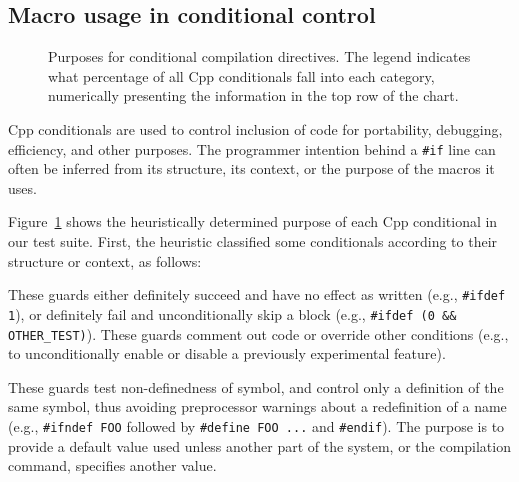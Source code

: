 \documentclass[10pt]{article}
\newcommand{\captionsmall}[1]{\caption[]{\small #1}}
\begin{document}


\subsection{Macro usage in conditional control}
\label{sec:ccd}

\begin{figure}
\centerline{}
\captionsmall{Purposes for conditional compilation directives.
  The legend indicates what percentage of all Cpp conditionals fall
  into each category, numerically presenting the information in the top row
  of the chart.}
\label{fig:ccd-categories}
\end{figure}

Cpp conditionals are used to control inclusion of code for portability,
debugging, efficiency, and other purposes.  The programmer intention behind
a {\tt \#if} line can often be inferred from its structure, its context, or
the purpose of the macros it uses.


Figure~\ref{fig:ccd-categories} shows the heuristically determined purpose
of each Cpp conditional in our test suite.  First, the heuristic classified
some conditionals according to their structure or context, as follows:
\begin{description}\itemsep 0pt \parskip 0pt
\item[Commenting] These guards either definitely succeed and
  have no effect as written (e.g., \texttt{\#ifdef 1}), or definitely fail
  and unconditionally skip a block (e.g., {\tt \#ifdef (0 \&\&
  \verb|OTHER_TEST|)}).  These guards comment out code or override other
  conditions (e.g., to unconditionally enable or disable a previously
  experimental feature).
      
\item[Redefinition suppression] These guards test non-definedness of
  symbol, and control only a definition of the same symbol, thus avoiding
  preprocessor warnings about a redefinition of a name (e.g.,
  \texttt{\#ifndef FOO} followed by \texttt{\#define FOO ...} and
  \texttt{\#endif}).  
  The purpose is to provide a default value used unless another part of the
  system, or the compilation command, specifies another value.

\end{description}
\end{document}
